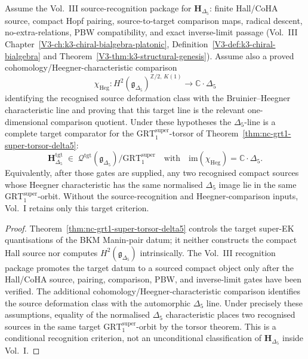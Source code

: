 \begin{corollary}
\label{cor:nc-h-delta5-unique-up-to-grt1}
\ClaimStatusConditional
Assume the Vol.~III source-recognition package for
$\mathbf H_{\Delta_5}$: finite Hall/CoHA source, compact Hopf pairing,
source-to-target comparison maps, radical descent, no-extra-relations,
PBW compatibility, and exact inverse-limit passage
(Vol.~III Chapter~\ref{V3-ch:k3-chiral-bialgebra-platonic},
Definition~\ref{V3-def:k3-chiral-bialgebra} and
Theorem~\ref{V3-thm:k3-structural-genesis}). Assume also a proved
cohomology/Heegner-characteristic comparison
\[
\chi_{\mathrm{Heg}}\colon
H^2(\mathfrak g_{\Delta_5})^{\mathbb Z/2,\,K(1)}
\longrightarrow
\mathbb C\cdot\Delta_5
\]
identifying the recognised source deformation class with the
Bruinier--Heegner characteristic line and proving that this target line
is the relevant one-dimensional comparison quotient. Under these
hypotheses the $\Delta_5$-line is a complete target comparator for the
$\mathrm{GRT}_1^{\mathrm{super}}$-torsor of
Theorem~\ref{thm:nc-grt1-super-torsor-delta5}:
\[
\mathbf H_{\Delta_5}^{\mathrm{tgt}}
\;\in\;
\mathcal Q^{\mathrm{tgt}}(\mathfrak g_{\Delta_5})
\big/\mathrm{GRT}_1^{\mathrm{super}}
\quad\text{with}\quad
\mathrm{im}(\chi_{\mathrm{Heg}})=\mathbb C\cdot\Delta_5 .
\]
Equivalently, after those gates are supplied, any two recognised
compact sources whose Heegner characteristic has the same normalised
$\Delta_5$ image lie in the same
$\mathrm{GRT}_1^{\mathrm{super}}$-orbit. Without the source-recognition
and Heegner-comparison inputs, Vol.~I retains only this target criterion.
\end{corollary}

\begin{proof}
Theorem~\ref{thm:nc-grt1-super-torsor-delta5} controls the target
super-EK quantisations of the BKM Manin-pair datum; it neither
constructs the compact Hall source nor computes
$H^2(\mathfrak g_{\Delta_5})$ intrinsically. The Vol.~III recognition
package promotes the target datum to a sourced compact object only
after the Hall/CoHA source, pairing, comparison, PBW, and inverse-limit
gates have been verified. The additional
cohomology/Heegner-characteristic comparison identifies the source
deformation class with the automorphic $\Delta_5$ line. Under precisely
these assumptions, equality of the normalised $\Delta_5$ characteristic
places two recognised sources in the same target
$\mathrm{GRT}_1^{\mathrm{super}}$-orbit by the torsor theorem. This is a
conditional recognition criterion, not an unconditional classification
of $\mathbf H_{\Delta_5}$ inside Vol.~I.
\end{proof}


